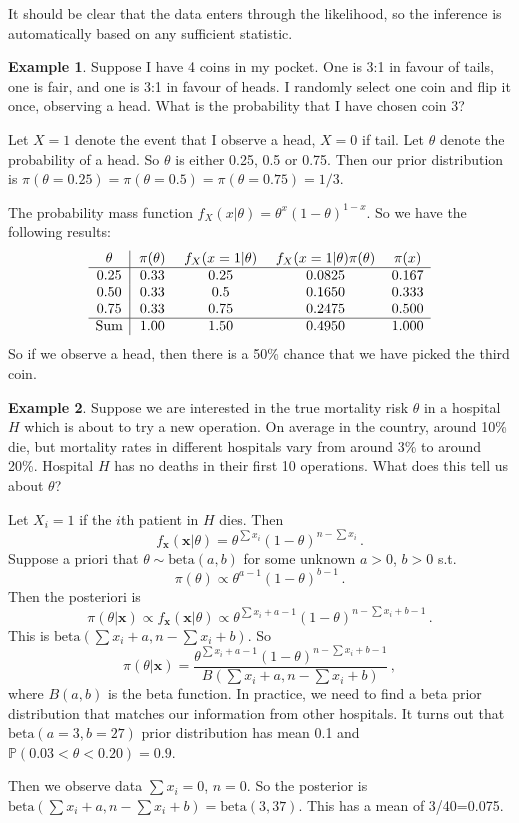 \documentclass[a4paper,11pt]{article}
\theoremstyle{definition}
\newtheorem*{ex}{Example}
\numberwithin{equation}{section}
\begin{document}
It should be clear that the data enters through the likelihood, so the inference is automatically based on any sufficient statistic.

\begin{ex}
Suppose I have 4 coins in my pocket. One is 3:1 in favour of tails, one is fair, and one is 3:1 in favour of heads. I randomly select one coin and flip it once, observing a head. What is the probability that I have chosen coin 3?

Let $X=1$ denote the event that I observe a head, $X=0$ if tail. Let $\theta$ denote the probability of a head. So $\theta$ is either 0.25, 0.5 or 0.75. Then our prior distribution is $\pi(\theta=0.25)=\pi(\theta=0.5)=\pi(\theta=0.75)=1/3$.

The probability mass function $f_X(x|\theta)=\theta^x(1-\theta)^{1-x}$. So we have the following results:
\[
\begin{array}{c | c c c c}
    \,\theta\, & \,\pi(\theta)\, & \,f_X(x=1|\theta)\, & \,f_X(x=1|\theta)\pi(\theta)\, & \,\pi(x)\, \\
    \hline
    0.25 & 0.33 & 0.25 & 0.0825 & 0.167\\
    0.50 & 0.33 & 0.5 & 0.1650 & 0.333\\
    0.75 & 0.33 & 0.75 & 0.2475 & 0.500\\
    \hline
    \text{Sum} & 1.00 & 1.50 & 0.4950 & 1.000
\end{array}
\]
So if we observe a head, then there is a 50\% chance that we have picked the third coin.
\end{ex}

\begin{ex}
Suppose we are interested in the true mortality risk $\theta$ in a hospital $H$ which is about to try a new operation. On average in the country, around 10\% die, but mortality rates in different hospitals vary from around 3\% to around 20\%. Hospital $H$ has no deaths in their first 10 operations. What does this tell us about $\theta$?

Let $X_i=1$ if the $i$th patient in $H$ dies. Then
\[
f_\mathbf{x}(\mathbf{x}|\theta)=\theta^{\sum x_i}(1-\theta)^{n-\sum x_i}\,.
\]
Suppose a priori that $\theta\sim\text{beta}(a,b)$ for some unknown $a>0$, $b>0$ s.t. 
\[
\pi(\theta)\propto\theta^{a-1}(1-\theta)^{b-1}\,.
\]
Then the posteriori is
\[
\pi(\theta|\mathbf{x})\propto f_\mathbf{x}(\mathbf{x}|\theta)\propto\theta^{\sum x_i+a-1}(1-\theta)^{n-\sum x_i+b-1}\,.
\]
This is $\text{beta}(\sum x_i+a,n-\sum x_i+b)$. So
\[
\pi(\theta|\mathbf{x})=\frac{\theta^{\sum x_i+a-1}(1-\theta)^{n-\sum x_i+b-1}}{B(\sum x_i+a,n-\sum x_i+b)}\,,
\]
where $B(a,b)$ is the beta function. In practice, we need to find a beta prior distribution that matches our information from other hospitals. It turns out that $\text{beta}(a=3,b=27)$ prior distribution has mean 0.1 and $\mathbb{P}(0.03<\theta<0.20)=0.9$.

Then we observe data $\sum x_i=0$, $n=0$. So the posterior is $\text{beta}(\sum x_i+a,n-\sum x_i+b)=\text{beta}(3,37)$. This has a mean of 3/40=0.075.
\end{ex}
\end{document}
